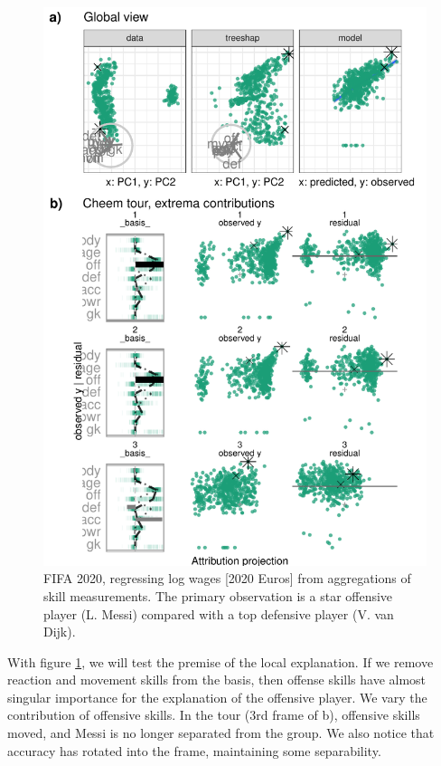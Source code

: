 \documentclass[
  article]{article}
\begin{document}
\begin{figure}

{\centering \includegraphics[width=1\linewidth]{./figures/case_fifa} 

}

\caption{FIFA 2020, regressing log wages [2020 Euros] from aggregations of skill measurements. The primary observation is a star offensive player (L. Messi) compared with a top defensive player (V. van Dijk).}\label{fig:casefifa}
\end{figure}

With figure \ref{fig:casefifa}, we will test the premise of the local explanation. If we remove reaction and movement skills from the basis, then offense skills have almost singular importance for the explanation of the offensive player. We vary the contribution of offensive skills. In the tour (3rd frame of b), offensive skills moved, and Messi is no longer separated from the group. We also notice that accuracy has rotated into the frame, maintaining some separability.
\end{document}
